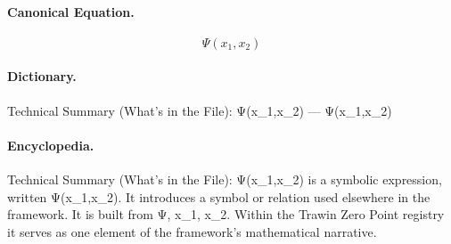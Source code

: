 \paragraph{Canonical Equation.}
\[
\Psi(x_1,x_2)
\]

\paragraph{Dictionary.}
Technical Summary (What’s in the File): Ψ(x\_1,x\_2) — Ψ(x\_1,x\_2)

\paragraph{Encyclopedia.}
Technical Summary (What’s in the File): Ψ(x\_1,x\_2) is a symbolic expression, written Ψ(x\_1,x\_2). It introduces a symbol or relation used elsewhere in the framework. It is built from Ψ, x\_1, x\_2. Within the Trawin Zero Point registry it serves as one element of the framework's mathematical narrative.
